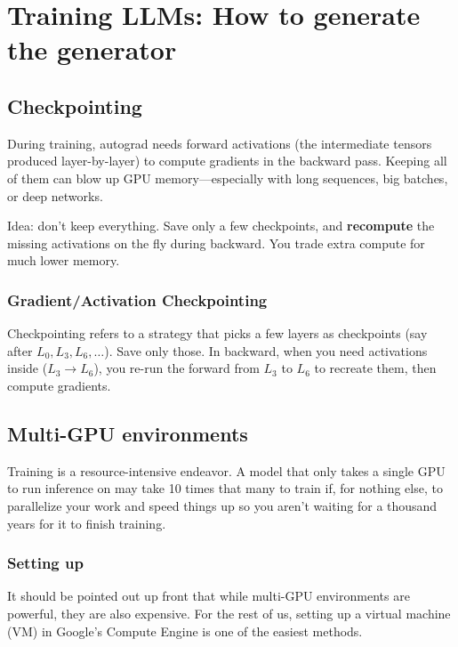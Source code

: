 \chapter{Training LLMs: How to generate the generator}

\section{Checkpointing}

During training, autograd needs forward activations (the intermediate tensors produced layer-by-layer) to compute gradients in the backward pass. Keeping all of them can blow up GPU memory—especially with long sequences, big batches, or deep networks.

Idea: don't keep everything. Save only a few checkpoints, and \textbf{recompute} the missing activations on the fly during backward. You trade extra compute for much lower memory.

\subsection{Gradient/Activation Checkpointing}

Checkpointing refers to a strategy that picks a few layers as checkpoints (say after $L_0, L_3, L_6, \dots$). Save only those. In backward, when you need activations inside ($L_3\to L_6$), you re-run the forward from $L_3$ to $L_6$ to recreate them, then compute gradients.

\section{Multi-GPU environments}
Training is a resource-intensive endeavor. A model that only takes a single GPU to run inference on may take 10 times that many to train if, for nothing else, to parallelize your work and speed things up so you aren't waiting for a thousand years for it to finish training.  

\subsection{Setting up} 
It should be pointed out up front that while multi-GPU environments are powerful, they are also expensive. For the rest of us, setting up a virtual machine (VM) in Google's Compute Engine is one of the easiest methods. 
